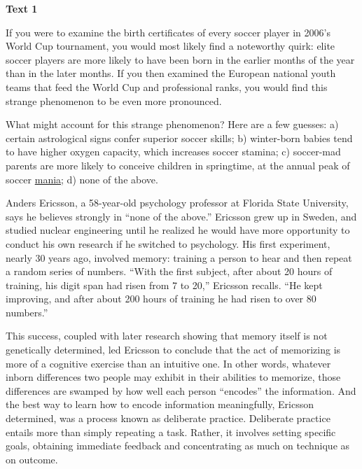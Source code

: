 
\begin{center}\textbf{Text 1}\end{center}

\qquad If you were to examine the birth certificates of every soccer player in 2006's World Cup tournament, you would most likely find a noteworthy quirk: elite soccer players are more likely to have been born in the earlier months of the year than in the later months. If you then examined the European national youth teams that feed the World Cup and professional ranks, you would find this strange phenomenon to be even more pronounced.

\qquad What might account for this strange phenomenon? Here are a few guesses: a) certain astrological signs confer superior soccer skills; b) winter-born babies tend to have higher oxygen capacity, which increases soccer stamina; c) soccer-mad parents are more likely to conceive children in springtime, at the annual peak of soccer \ul{mania}; d) none of the above.

\qquad Anders Ericsson, a 58-year-old psychology professor at Florida State University, says he believes strongly in ``none of the above.'' Ericsson grew up in Sweden, and studied nuclear engineering until he realized he would have more opportunity to conduct his own research if he switched to psychology. His first experiment, nearly 30 years ago, involved memory: training a person to hear and then repeat a random series of numbers. ``With the first subject, after about 20 hours of training, his digit span had risen from 7 to 20,'' Ericsson recalls. ``He kept improving, and after about 200 hours of training he had risen to over 80 numbers.''

\qquad This success, coupled with later research showing that memory itself is not genetically determined, led Ericsson to conclude that the act of memorizing is more of a cognitive exercise than an intuitive one. In other words, whatever inborn differences two people may exhibit in their abilities to memorize, those differences are swamped by how well each person ``encodes'' the information. And the best way to learn how to encode information meaningfully, Ericsson determined, was a process known as deliberate practice. Deliberate practice entails more than simply repeating a task. Rather, it involves setting specific goals, obtaining immediate feedback and concentrating as much on technique as on outcome.

